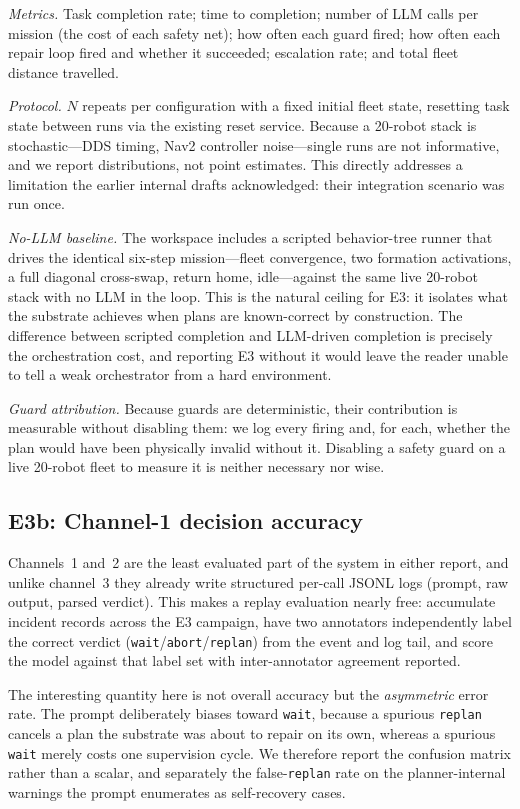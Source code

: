 \documentclass[10pt,twocolumn]{article}
\newcommand{\code}[1]{\texttt{\small #1}}
\begin{document}
\emph{Metrics.} Task completion rate; time to completion; number of LLM calls
per mission (the cost of each safety net); how often each guard fired; how
often each repair loop fired and whether it succeeded; escalation rate; and
total fleet distance travelled.

\emph{Protocol.} $N$ repeats per configuration with a fixed initial fleet
state, resetting task state between runs via the existing reset service.
Because a 20-robot stack is stochastic---DDS timing, Nav2 controller
noise---single runs are not informative, and we report distributions, not
point estimates. This directly addresses a limitation the earlier internal drafts
acknowledged: their integration scenario was run once.

\emph{No-LLM baseline.} The workspace includes a scripted behavior-tree runner
that drives the identical six-step mission---fleet convergence, two formation
activations, a full diagonal cross-swap, return home, idle---against the same
live 20-robot stack with no LLM in the loop. This is
the natural ceiling for E3: it isolates what the substrate achieves when plans
are known-correct by construction. The difference between scripted completion
and LLM-driven completion is precisely the orchestration cost, and reporting
E3 without it would leave the reader unable to tell a weak orchestrator from a
hard environment.

\emph{Guard attribution.} Because guards are deterministic, their contribution
is measurable without disabling them: we log every firing and, for each,
whether the plan would have been physically invalid without it. Disabling a
safety guard on a live 20-robot fleet to measure it is neither necessary nor
wise.

\subsection{E3b: Channel-1 decision accuracy}
\label{sec:e3b}

Channels~1 and~2 are the least evaluated part of the system in either report,
and unlike channel~3 they already write structured per-call JSONL logs
(prompt, raw output, parsed verdict). This makes a replay evaluation nearly
free: accumulate incident records across the E3 campaign, have two
annotators independently label the correct verdict
(\code{wait}/\code{abort}/\code{replan}) from the event and log tail, and score
the model against that label set with inter-annotator agreement reported.

The interesting quantity here is not overall accuracy but the
\emph{asymmetric} error rate. The prompt deliberately biases toward
\code{wait}, because a spurious \code{replan} cancels a plan the substrate was
about to repair on its own, whereas a spurious \code{wait} merely costs one
supervision cycle. We therefore report the confusion matrix rather than a
scalar, and separately the false-\code{replan} rate on the planner-internal
warnings the prompt enumerates as self-recovery cases.
\end{document}
